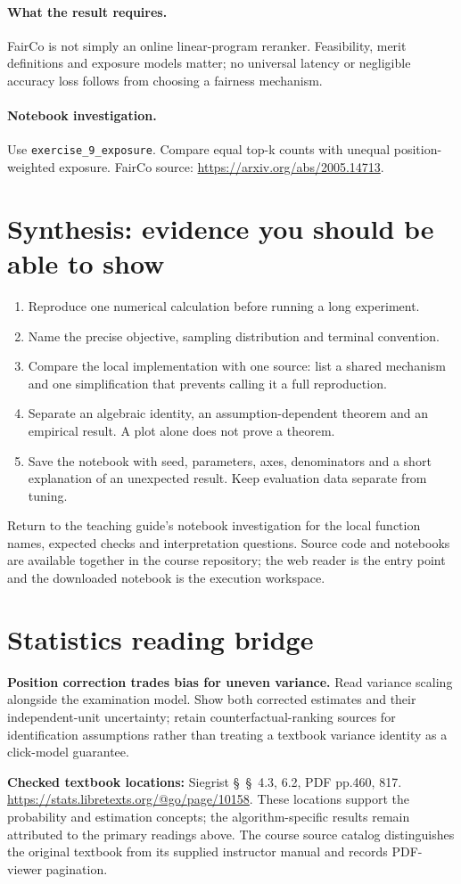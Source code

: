 \documentclass[11pt]{scrartcl}
\begin{document}
\paragraph{What the result requires.} FairCo is not simply an online linear-program reranker. Feasibility, merit definitions and exposure models matter; no universal latency or negligible accuracy loss follows from choosing a fairness mechanism.

\paragraph{Notebook investigation.} Use \texttt{exercise\_9\_exposure}. Compare equal top-k counts with unequal position-weighted exposure. FairCo source: \url{https://arxiv.org/abs/2005.14713}.

\section*{Synthesis: evidence you should be able to show}
\begin{enumerate}
\item Reproduce one numerical calculation before running a long experiment.
\item Name the precise objective, sampling distribution and terminal convention.
\item Compare the local implementation with one source: list a shared mechanism
and one simplification that prevents calling it a full reproduction.
\item Separate an algebraic identity, an assumption-dependent theorem and an
empirical result. A plot alone does not prove a theorem.
\item Save the notebook with seed, parameters, axes, denominators and a short
explanation of an unexpected result. Keep evaluation data separate from tuning.
\end{enumerate}
Return to the teaching guide's notebook investigation for the local function
names, expected checks and interpretation questions. Source code and notebooks
are available together in the course repository; the web reader is the entry
point and the downloaded notebook is the execution workspace.
\section*{Statistics reading bridge}
\textbf{Position correction trades bias for uneven variance.} Read variance scaling alongside the examination model. Show both corrected estimates and their independent-unit uncertainty; retain counterfactual-ranking sources for identification assumptions rather than treating a textbook variance identity as a click-model guarantee.

\textbf{Checked textbook locations:} Siegrist \S~\S~4.3, 6.2, PDF pp.460, 817. \url{https://stats.libretexts.org/@go/page/10158}. These locations support the probability and estimation concepts; the algorithm-specific results remain attributed to the primary readings above. The course source catalog distinguishes the original textbook from its supplied instructor manual and records PDF-viewer pagination.
\end{document}
